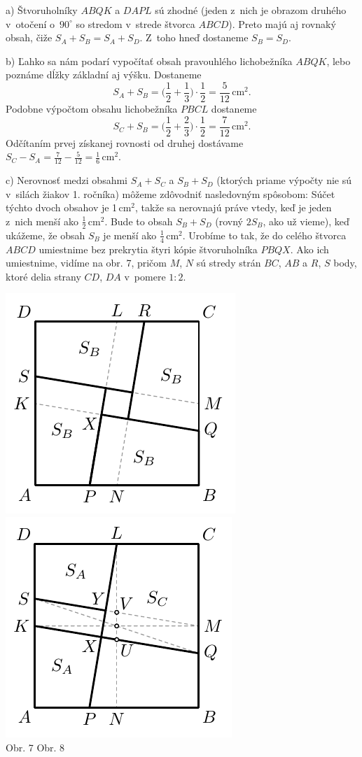 \rieh  a) Štvoruholníky $ABQK$ a $DAPL$ sú zhodné (jeden z~nich je obrazom druhého v~otočení o~$90^\circ$ so stredom v~strede štvorca $ABCD$). Preto majú aj rovnaký obsah, čiže $S_A + S_B = S_A + S_D$. Z~toho hneď dostaneme $S_B = S_D$.

b) Ľahko sa nám podarí vypočítať obsah pravouhlého lichobežníka $ABQK$, lebo poznáme dĺžky základní aj výšku. Dostaneme
$$S_A + S_B =\bigg( \frac{1}{2}+\frac{1}{3}\bigg)\cdot \frac{1}{2}=\frac{5}{12}\,\text{cm}^2.$$
Podobne výpočtom obsahu lichobežníka $PBCL$ dostaneme
$$S_C + S_B =\bigg(\frac{1}{2}+\frac{2}{3}\bigg)\cdot\frac{1}{2}=\frac{7}{12}\,\text{cm}^2.$$
Odčítaním prvej získanej rovnosti od druhej dostávame $S_C - S_A =\frac{7}{12}-\frac{5}{12}=\frac{1}{6}\,\text{cm}^2$.

c) Nerovnosť medzi obsahmi $S_A + S_C$ a $S_B + S_D$ (ktorých priame výpočty nie sú v~silách žiakov 1. ročníka) môžeme zdôvodniť nasledovným spôsobom: Súčet týchto dvoch obsahov je 1\,cm$^2$, takže sa nerovnajú práve vtedy, keď je jeden z~nich menší ako $\frac{1}{2}$\,cm$^2$. Bude to obsah $S_B +S_D$ (rovný $2S_B$, ako už vieme), keď ukážeme, že obsah $S_B$ je menší ako $\frac{1}{4}$\,cm$^2$. Urobíme to tak, že do celého štvorca $ABCD$ umiestnime bez prekrytia štyri kópie štvoruholníka $PBQX$. Ako ich umiestnime, vidíme na obr. 7, pričom $M$, $N$ sú stredy strán $BC$, $AB$ a $R$, $S$ body, ktoré delia strany $CD$, $DA$ v~pomere $1 : 2$.
\begin{center}
\includegraphics{obrazky/60D32} \includegraphics{obrazky/60D33}\\

Obr. 7 \hspace{140pt} Obr. 8
\end{center}
